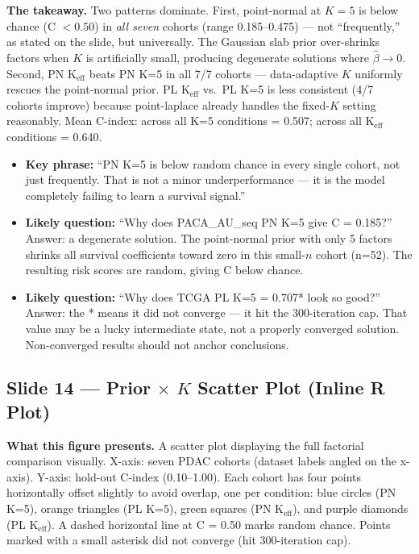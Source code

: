 \documentclass[11pt]{article}
\newcommand{\sectionlabel}[1]{\textbf{#1}}
\begin{document}
\textbf{The takeaway.} Two patterns dominate. First, point-normal at $K = 5$ is below chance (C $< 0.50$) in \emph{all seven} cohorts (range 0.185--0.475) --- not ``frequently,'' as stated on the slide, but universally. The Gaussian slab prior over-shrinks factors when $K$ is artificially small, producing degenerate solutions where $\hat{\beta} \to 0$. Second, PN K$_\text{eff}$ beats PN K=5 in all 7/7 cohorts --- data-adaptive $K$ uniformly rescues the point-normal prior. PL K$_\text{eff}$ vs.\ PL K=5 is less consistent (4/7 cohorts improve) because point-laplace already handles the fixed-$K$ setting reasonably. Mean C-index: across all K=5 conditions = 0.507; across all K$_\text{eff}$ conditions = 0.640.

\begin{itemize}
  \item \sectionlabel{Key phrase:} ``PN K=5 is below random chance in every single cohort, not just frequently. That is not a minor underperformance --- it is the model completely failing to learn a survival signal.''
  \item \sectionlabel{Likely question:} ``Why does PACA\_AU\_seq PN K=5 give C = 0.185?'' Answer: a degenerate solution. The point-normal prior with only 5 factors shrinks all survival coefficients toward zero in this small-$n$ cohort (n=52). The resulting risk scores are random, giving C below chance.
  \item \sectionlabel{Likely question:} ``Why does TCGA PL K=5 = 0.707* look so good?'' Answer: the * means it did not converge --- it hit the 300-iteration cap. That value may be a lucky intermediate state, not a properly converged solution. Non-converged results should not anchor conclusions.
\end{itemize}

\subsection*{Slide 14 --- Prior $\times$ $K$ Scatter Plot (Inline R Plot)}

\textbf{What this figure presents.} A scatter plot displaying the full factorial comparison visually. X-axis: seven PDAC cohorts (dataset labels angled on the x-axis). Y-axis: hold-out C-index (0.10--1.00). Each cohort has four points horizontally offset slightly to avoid overlap, one per condition: blue circles (PN K=5), orange triangles (PL K=5), green squares (PN K$_\text{eff}$), and purple diamonds (PL K$_\text{eff}$). A dashed horizontal line at C = 0.50 marks random chance. Points marked with a small asterisk did not converge (hit 300-iteration cap).
\end{document}
